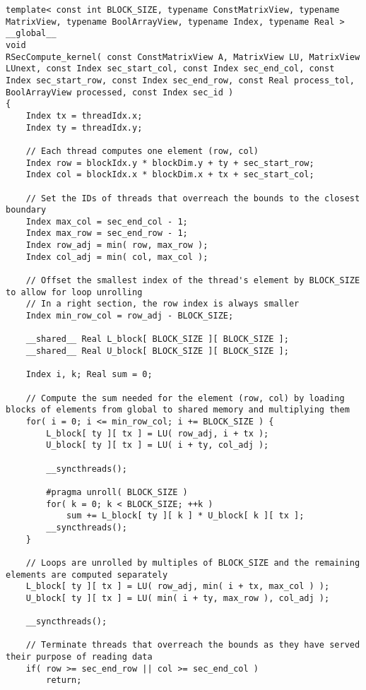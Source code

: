 \begin{lstlisting}[caption={Implementation of the \code{RSecCompute\_kernel()} kernel which computes one iteration of a right section.},label={Listing:ICMxPP-implementation->kernels->right-section-compute}]
template< const int BLOCK_SIZE, typename ConstMatrixView, typename MatrixView, typename BoolArrayView, typename Index, typename Real >
__global__
void
RSecCompute_kernel( const ConstMatrixView A, MatrixView LU, MatrixView LUnext, const Index sec_start_col, const Index sec_end_col, const Index sec_start_row, const Index sec_end_row, const Real process_tol, BoolArrayView processed, const Index sec_id )
{
	Index tx = threadIdx.x;
	Index ty = threadIdx.y;
	
	// Each thread computes one element (row, col)
	Index row = blockIdx.y * blockDim.y + ty + sec_start_row;
	Index col = blockIdx.x * blockDim.x + tx + sec_start_col;
	
	// Set the IDs of threads that overreach the bounds to the closest boundary
	Index max_col = sec_end_col - 1;
	Index max_row = sec_end_row - 1;
	Index row_adj = min( row, max_row );
	Index col_adj = min( col, max_col );
	
	// Offset the smallest index of the thread's element by BLOCK_SIZE to allow for loop unrolling
	// In a right section, the row index is always smaller
	Index min_row_col = row_adj - BLOCK_SIZE;
	
	__shared__ Real L_block[ BLOCK_SIZE ][ BLOCK_SIZE ];
	__shared__ Real U_block[ BLOCK_SIZE ][ BLOCK_SIZE ];
	
	Index i, k; Real sum = 0;
	
	// Compute the sum needed for the element (row, col) by loading blocks of elements from global to shared memory and multiplying them
	for( i = 0; i <= min_row_col; i += BLOCK_SIZE ) {
		L_block[ ty ][ tx ] = LU( row_adj, i + tx );
		U_block[ ty ][ tx ] = LU( i + ty, col_adj );
		
		__syncthreads();
		
		#pragma unroll( BLOCK_SIZE )
		for( k = 0; k < BLOCK_SIZE; ++k )
			sum += L_block[ ty ][ k ] * U_block[ k ][ tx ];
		__syncthreads();
	}
	
	// Loops are unrolled by multiples of BLOCK_SIZE and the remaining elements are computed separately
	L_block[ ty ][ tx ] = LU( row_adj, min( i + tx, max_col ) );
	U_block[ ty ][ tx ] = LU( min( i + ty, max_row ), col_adj );
	
	__syncthreads();
	
	// Terminate threads that overreach the bounds as they have served their purpose of reading data
	if( row >= sec_end_row || col >= sec_end_col )
		return;
	

\end{lstlisting}
